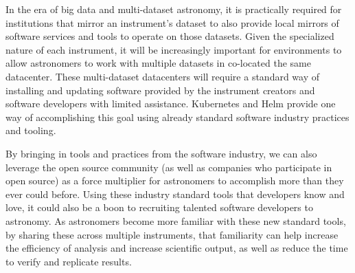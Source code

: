 \documentclass[11pt,twoside]{article}
\begin{document}
In the era of big data and multi-dataset astronomy, it is practically required
for institutions that mirror an instrument's dataset to also provide local mirrors
of software services and tools to operate on those datasets.  Given the specialized
nature of each instrument, it will be increasingly important for environments
to allow astronomers to work with multiple datasets in co-located the same datacenter.
These multi-dataset datacenters will require a standard
way of installing and updating software provided by the instrument creators and software
developers with limited assistance. Kubernetes and Helm provide one way of accomplishing
this goal using already standard software industry practices and tooling.

By bringing in tools and practices from the software industry, we can also
leverage the open source community (as well as companies who participate in
open source) as a force multiplier for astronomers to accomplish
more than they ever could before. Using these industry standard tools that
developers know and love, it could also be a boon to recruiting talented
software developers to astronomy.  As astronomers become more familiar with
these new standard tools, by sharing these across multiple instruments, that
familiarity can help increase the efficiency of analysis and increase scientific
output, as well as reduce the time to verify and replicate results.



\end{document}
